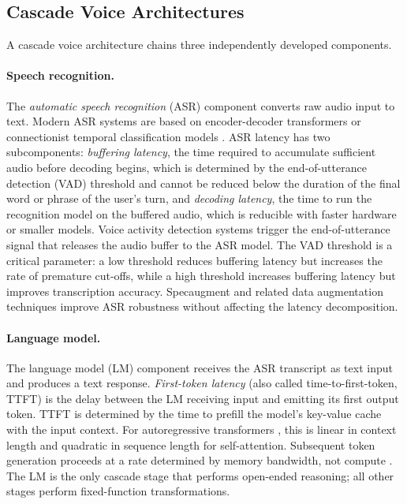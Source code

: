 \subsection{Cascade Voice Architectures}

A cascade voice architecture chains three independently developed components.

\paragraph{Speech recognition.}
The \emph{automatic speech recognition} (ASR) component converts raw audio input to text.
Modern ASR systems are based on encoder-decoder transformers \citep{radford2022whisper}
or connectionist temporal classification models \citep{graves2006ctc}.
ASR latency has two subcomponents:
\emph{buffering latency}, the time required to accumulate sufficient audio before decoding begins,
which is determined by the end-of-utterance detection (VAD) threshold and cannot be reduced below
the duration of the final word or phrase of the user's turn,
and \emph{decoding latency}, the time to run the recognition model on the buffered audio,
which is reducible with faster hardware or smaller models.
Voice activity detection systems \citep{raux2008optimizing} trigger the end-of-utterance signal
that releases the audio buffer to the ASR model.
The VAD threshold is a critical parameter: a low threshold reduces buffering latency but
increases the rate of premature cut-offs, while a high threshold increases buffering latency
but improves transcription accuracy.
Specaugment \citep{park2019specaugment} and related data augmentation techniques improve
ASR robustness without affecting the latency decomposition.

\paragraph{Language model.}
The language model (LM) component receives the ASR transcript as text input and produces a
text response.
\emph{First-token latency} (also called time-to-first-token, TTFT) is the delay between the LM
receiving input and emitting its first output token.
TTFT is determined by the time to prefill the model's key-value cache with the input context.
For autoregressive transformers \citep{vaswani2017attention}, this is linear in context length
and quadratic in sequence length for self-attention.
Subsequent token generation proceeds at a rate determined by memory bandwidth,
not compute \citep{leviathan2023fast}.
The LM is the only cascade stage that performs open-ended reasoning;
all other stages perform fixed-function transformations.

